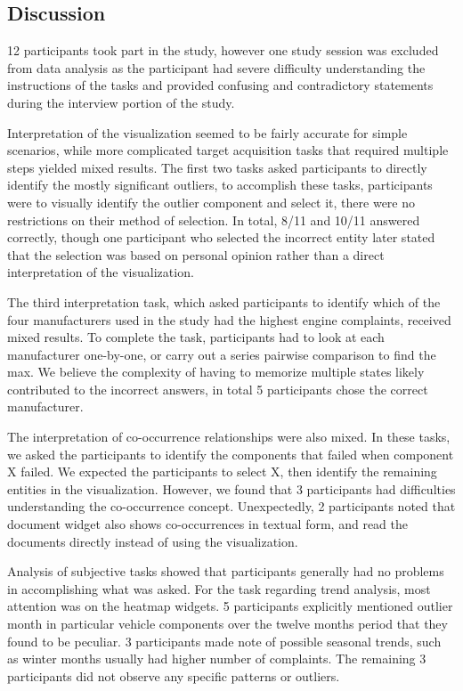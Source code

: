 \subsection{Discussion}
12 participants took part in the study, however one study session was excluded
from data analysis as the participant had severe difficulty understanding the
instructions of the tasks and provided confusing and contradictory statements
during the interview portion of the study.

Interpretation of the \threed visualization seemed to be fairly accurate for
simple scenarios, while more complicated target acquisition tasks that required
multiple steps yielded mixed results. The first two tasks asked
participants to directly identify the mostly significant outliers, to accomplish
these tasks, participants were to visually identify the outlier \threed
component and select it, there were no restrictions on their method of
selection. In total, 8/11 and 10/11 answered correctly, though one participant
who selected the incorrect entity later stated that the selection was based on
personal opinion rather than a direct interpretation of the visualization.

The third interpretation task, which asked participants to identify which of the four
manufacturers used in the study had the highest engine complaints, received
mixed results. To complete the task, participants had to look at each
manufacturer one-by-one, or carry out a series pairwise comparison to find the
max. We believe the complexity of having to memorize multiple states likely
contributed to the incorrect answers, in total 5 participants chose the correct
manufacturer. 

The interpretation of co-occurrence relationships were also mixed. In these
tasks, we asked the participants to identify the components that failed when
component X failed. We expected the participants to select X, then identify the
remaining entities in the visualization. However, we found that 3 participants
had difficulties understanding the co-occurrence concept. Unexpectedly, 2
participants noted that document widget also shows co-occurrences in textual
form, and read the documents directly instead of using the \threed
visualization.

Analysis of subjective tasks showed that participants generally had no problems
in accomplishing what was asked. For the task regarding trend analysis, most
attention was on the heatmap widgets. 5 participants explicitly mentioned
outlier month in particular vehicle components over the twelve months period
that they found to be peculiar. 3 participants made note of possible seasonal trends,
such as winter months usually had higher number of complaints. The remaining 3
participants did not observe any specific patterns or outliers. 


